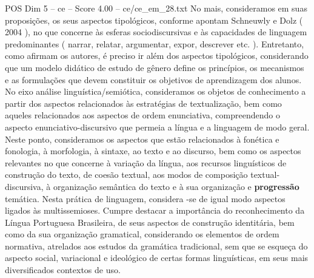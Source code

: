\begin{textsample}{POS Dim 5 – ce – Score 4.00 – ce/ce\_em\_28.txt}
No mais, consideramos em suas proposições, os seus aspectos tipológicos, conforme apontam Schneuwly e Dolz ( 2004 ), no que concerne às esferas sociodiscursivas e às capacidades de linguagem predominantes ( narrar, relatar, argumentar, expor, descrever etc. ).
Entretanto, como afirmam os autores, é preciso ir além dos aspectos tipológicos, considerando que um modelo didático de estudo de gênero define os princípios, os mecanismos e as formulações que devem constituir os objetivos de aprendizagem dos alunos.
No eixo análise linguística/semiótica, consideramos os objetos de conhecimento a partir dos aspectos relacionados às estratégias de textualização, bem como aqueles relacionados aos aspectos de ordem enunciativa, compreendendo o aspecto enunciativo-discursivo que permeia a língua e a linguagem de modo geral.
Neste ponto, consideramos os aspectos que estão relacionados à fonética e fonologia, à morfologia, à sintaxe, ao texto e ao discurso, bem como os aspectos relevantes no que concerne à variação da língua, aos recursos linguísticos de construção do texto, de coesão textual, aos modos de composição textual-discursiva, à organização semântica do texto e à sua organização e \textbf{progressão} temática.
Nesta prática de linguagem, considera -se de igual modo aspectos ligados às multissemioses.
Cumpre destacar a importância do reconhecimento da Língua Portuguesa Brasileira, de seus aspectos de construção identitária, bem como da sua organização gramatical, considerando os elementos de ordem normativa, atrelados aos estudos da gramática tradicional, sem que se esqueça do aspecto social, variacional e ideológico de certas formas linguísticas, em seus mais diversificados contextos de uso.

\end{textsample}
